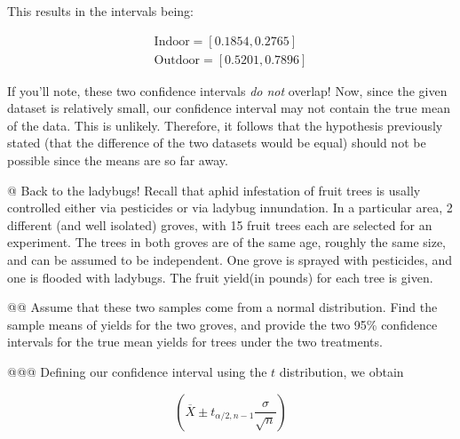 \documentclass[10pt]{article}\usepackage[]{graphicx}\usepackage[]{xcolor}
\begin{document}
\begin{easylist}[enumerate]
    This results in the intervals being:

    \[
        \begin{aligned}
            \text{Indoor} = \left[ 0.1854, 0.2765 \right]\\
            \text{Outdoor} = \left[ 0.5201, 0.7896 \right]
        \end{aligned}
    \]

    If you'll note, these two confidence intervals \textit{do not} overlap! Now, since the given dataset is relatively
    small, our confidence interval may not contain the true mean of the data. This is unlikely. Therefore, it follows
    that the hypothesis previously stated (that the difference of the two datasets would be equal) should not be
    possible since the means are so far away.


    @ Back to the ladybugs! Recall that aphid infestation of fruit trees is usally controlled either via pesticides or
    via ladybug innundation. In a particular area, 2 different (and well isolated) groves, with 15 fruit trees each are
    selected for an experiment. The trees in both groves are of the same age, roughly the same size, and can be assumed
    to be independent. One grove is sprayed with pesticides, and one is flooded with ladybugs. The fruit yield(in
    pounds) for each tree is given.

    @@ Assume that these two samples come from a normal distribution. Find the sample means of yields for the two
    groves, and provide the two 95\% confidence intervals for the true mean yields for trees under the two treatments.

    @@@ Defining our confidence interval using the $t$ distribution, we obtain

    \[
        \left( \overline{X} \pm t_{\alpha / 2, n - 1} \frac{\sigma}{\sqrt{n}} \right)
    \]


\end{easylist}
\end{document}
